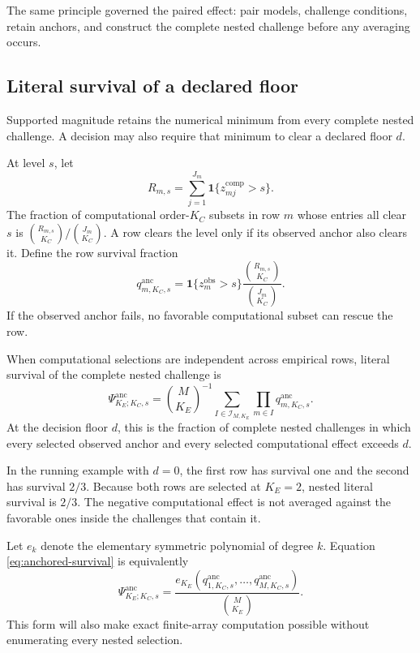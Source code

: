 \documentclass[11pt]{article}
\newcommand{\Psianc}{\Psi^{\mathrm{anc}}}
\theoremstyle{remark}
\begin{document}
The same principle governed the paired effect: pair models, challenge
conditions, retain anchors, and construct the complete nested challenge before
any averaging occurs.

\subsection{Literal survival of a declared floor}

Supported magnitude retains the numerical minimum from every complete nested
challenge. A decision may also require that minimum to clear a declared floor
$d$.

At level $s$, let
\[
R_{m,s}
=
\sum_{j=1}^{J_m}
\mathbf 1\{z_{mj}^{\mathrm{comp}}>s\}.
\]
The fraction of computational order-$K_C$ subsets in row $m$ whose entries all
clear $s$ is
$\binom{R_{m,s}}{K_C}/\binom{J_m}{K_C}$. A row clears the level only if its
observed anchor also clears it. Define the row survival fraction
\begin{equation}
q^{\mathrm{anc}}_{m,K_C,s}
=
\mathbf 1\{z_m^{\mathrm{obs}}>s\}
\frac{\binom{R_{m,s}}{K_C}}
{\binom{J_m}{K_C}}.
\label{eq:row-survival}
\end{equation}
If the observed anchor fails, no favorable computational subset can rescue the
row.

When computational selections are independent across empirical rows, literal
survival of the complete nested challenge is
\begin{equation}
\Psianc_{K_E;K_C,s}
=
\binom{M}{K_E}^{-1}
\sum_{I\in\mathcal I_{M,K_E}}
\prod_{m\in I}q^{\mathrm{anc}}_{m,K_C,s}.
\label{eq:anchored-survival}
\end{equation}
At the decision floor $d$, this is the fraction of complete nested challenges
in which every selected observed anchor and every selected computational
effect exceeds $d$.

In the running example with $d=0$, the first row has survival one and the
second has survival $2/3$. Because both rows are selected at $K_E=2$, nested
literal survival is $2/3$. The negative computational effect is not averaged
against the favorable ones inside the challenges that contain it.

Let $e_k$ denote the elementary symmetric polynomial of degree $k$. Equation
\eqref{eq:anchored-survival} is equivalently
\begin{equation}
\Psianc_{K_E;K_C,s}
=
\frac{e_{K_E}\left(
q^{\mathrm{anc}}_{1,K_C,s},\ldots,
q^{\mathrm{anc}}_{M,K_C,s}
\right)}{\binom{M}{K_E}}.
\label{eq:elementary-symmetric}
\end{equation}
This form will also make exact finite-array computation possible without
enumerating every nested selection.
\end{document}
